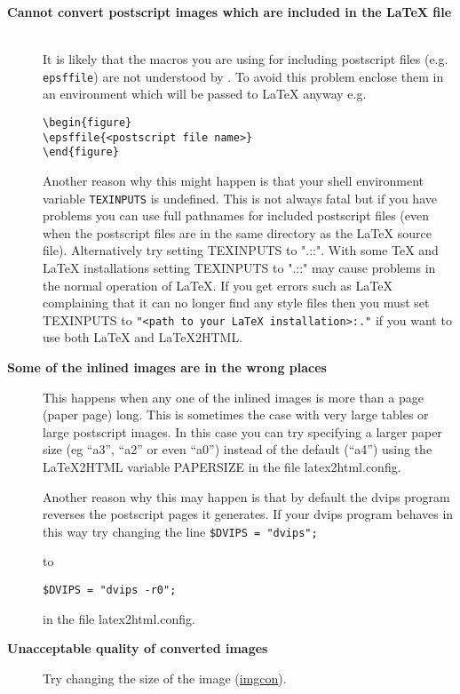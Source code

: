 \begin{description}
\item [{\bf Cannot convert postscript images which are included
in the LaTeX file}] \hfill \\
It is likely that the macros you are using for including postscript
files (e.g. {\tt epsffile}) are not understood by \latextohtml.
To avoid this problem enclose them in an environment which will
be passed to LaTeX anyway e.g.
\begin{verbatim}
\begin{figure}
\epsffile{<postscript file name>}
\end{figure}
\end{verbatim}

Another reason why this might happen is that your shell 
environment variable 
{\tt TEXINPUTS} is undefined. This is not always 
fatal but if you have problems you can use full
pathnames for included postscript files (even when the postscript
files are in the same directory as the LaTeX source file).
Alternatively try setting TEXINPUTS to ".::". 
With some TeX and LaTeX installations setting TEXINPUTS to 
".::" may cause problems in the normal operation of LaTeX.
If you get errors such as LaTeX complaining that it can no longer find
any style files then you must set TEXINPUTS to 
\verb|"<path to your LaTeX installation>:."|
if you want to use both LaTeX and LaTeX2HTML.

\item [{\bf Some of the inlined images are in the wrong places}]
This happens when any one of the inlined images is more than a page
(paper page) long. This is sometimes the case with very large tables
or large postscript images. In this case you can try specifying 
a larger paper size (eg ``a3'', ``a2'' or even ``a0'') instead of
the default (``a4'') using the LaTeX2HTML variable {\fn PAPERSIZE} 
in the file {\fn latex2html.config}.

Another reason why this may happen is that by default the {\fn dvips} program
reverses the postscript pages it generates. If your {\fn dvips
program}
behaves in this way try changing the line
\verb|$DVIPS = "dvips";| 

to

\verb|$DVIPS = "dvips -r0";|

in the file {\fn latex2html.config}.

\item [{\bf Unacceptable quality of converted images}]
Try changing the size of the image 
(\hyperref{See image conversion}{See Section }{}{imgcon}).


\end{description}

